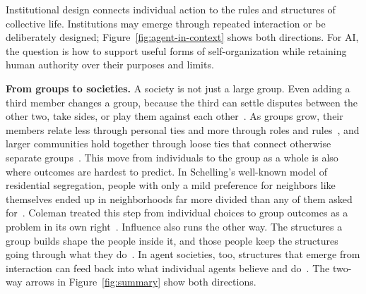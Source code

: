 \documentclass[runningheads]{llncs}
\begin{document}
Institutional design connects individual action to the rules and structures of collective life. Institutions may emerge through repeated interaction or be deliberately designed; Figure~\mbox{\ref{fig:agent-in-context}} shows both directions. For AI, the question is how to support useful forms of self-organization while retaining human authority over their purposes and limits.

\textbf{From groups to societies.} A society is not just a large group. Even adding a third member changes a group, because the third can settle disputes between the other two, take sides, or play them against each other~\mbox{\citep{simmel1902numberII}}. As groups grow, their members relate less through personal ties and more through roles and rules~\mbox{\citep{simmel1902numberI}}, and larger communities hold together through loose ties that connect otherwise separate groups~\mbox{\citep{granovetter1973weak}}. This move from individuals to the group as a whole is also where outcomes are hardest to predict. In Schelling's well-known model of residential segregation, people with only a mild preference for neighbors like themselves ended up in neighborhoods far more divided than any of them asked for~\mbox{\citep{schelling1978micromotives}}. Coleman treated this step from individual choices to group outcomes as a problem in its own right~\mbox{\citep{coleman1990foundations}}. Influence also runs the other way. The structures a group builds shape the people inside it, and those people keep the structures going through what they do~\mbox{\citep{giddens1984constitution}}. In agent societies, too, structures that emerge from interaction can feed back into what individual agents believe and do~\mbox{\citep{castelfranchi1998modelling}}. The two-way arrows in Figure~\mbox{\ref{fig:summary}} show both directions.
\end{document}
